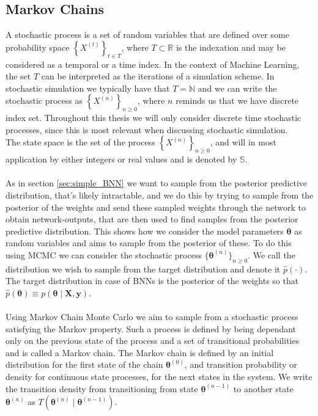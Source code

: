\subsection{Markov Chains}\label{sec:basic_mc}

A stochastic process is a set of random variables that are defined over some probability space $\left\{X^{(t)} \right\}_{t\in T}$, where $T\subset \mathbb{R}$ is the indexation and may be considered as a temporal or a time index. In the context of Machine Learning, the set $T$ can be interpreted as the iterations of a simulation scheme. In stochastic simulation we typically have that $T=\mathbb{N}$ and we can write the stochastic process as $\left\{X^{(n)}\right\}_{n\geq 0}$, where $n$ reminds us that we have discrete index set. Throughout this thesis we will only consider discrete time stochastic processes, since this is most relevant when discussing stochastic simulation. \\
The state space is the set of the process $\left\{X^{(n)} \right\}_{n\geq 0}$, and will in most application by either integers or real values and is denoted by $\mathbb{S}$. 
\\
\\
As in section \ref{sec:simple_BNN} we want to sample from the posterior predictive distribution, that's likely intractable, and we do this by trying to sample from the posterior of the weights and send these sampled weights through the network to obtain network-outputs, that are then used to find samples from the posterior predictive distribution. This shows how we consider the model parameters $\boldsymbol{\theta}$ as random variables and aims to sample from the posterior of these. To do this using MCMC we can consider the stochastic process $\{\boldsymbol{\theta}^{(n)}\}_{n\geq 0}$. We call the distribution we wish to sample from the target distribution and denote it $\hat{p}(\cdot)$. The target distribution in case of BNNs is the posterior of the weights so that $\hat{p}(\boldsymbol{\theta})\equiv p(\boldsymbol{\theta}\mid \mathbf{X},\mathbf{y})$.
\\
\\
Using Markov Chain Monte Carlo we aim to sample from a stochastic process satisfying the Markov property. Such a process is defined by being dependant only on the previous state of the process and a set of transitional probabilities and is called a Markov chain. The Markov chain is defined by an initial distribution for the first state of the chain $\boldsymbol{\theta}^{(0)}$, and transition probability or density for continuous state processes, for the next states in the system. We write the transition density from transitioning from state $\boldsymbol{\theta}^{(n-1)}$ to another state $\boldsymbol{\theta}^{(n)}$ as $T(\boldsymbol{\theta}^{(n)}\mid \boldsymbol{\theta}^{(n-1)})$. \\
